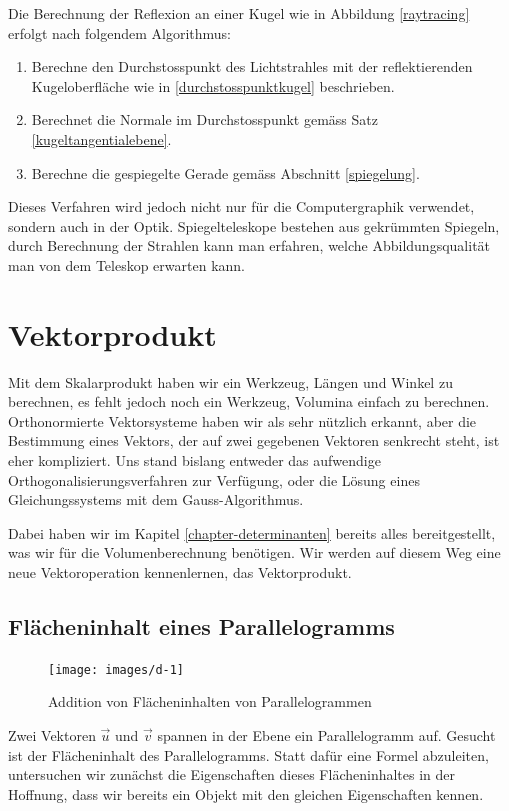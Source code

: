 Die Berechnung der Reflexion an einer Kugel wie in Abbildung \ref{raytracing}
erfolgt nach folgendem Algorithmus:
\begin{enumerate}
\item Berechne den Durchstosspunkt des Lichtstrahles mit der reflektierenden
Kugeloberfläche wie in \ref{durchstosspunktkugel} beschrieben.
\item Berechnet die Normale im Durchstosspunkt gemäss Satz \ref{kugeltangentialebene}.
\item Berechne die gespiegelte Gerade gemäss Abschnitt \ref{spiegelung}.
\end{enumerate}
Dieses Verfahren wird jedoch nicht nur für die Computergraphik verwendet,
sondern auch in der Optik.
Spiegelteleskope bestehen aus gekrümmten Spiegeln,
durch Berechnung der Strahlen kann man erfahren, welche Abbildungsqualität
man von dem Teleskop erwarten kann.

\section{Vektorprodukt}
Mit dem Skalarprodukt haben wir ein Werkzeug, Längen und Winkel zu berechnen,
es fehlt jedoch noch ein Werkzeug, Volumina einfach zu berechnen.
Orthonormierte
Vektorsysteme haben wir als sehr nützlich erkannt, aber die Bestimmung eines
Vektors, der auf zwei gegebenen Vektoren senkrecht steht, ist eher kompliziert.
Uns stand bislang entweder das
aufwendige Orthogonalisierungsverfahren zur Verfügung, oder die Lösung
eines Gleichungssystems mit dem Gauss-Algorithmus.

Dabei haben wir im Kapitel \ref{chapter-determinanten} bereits alles
bereitgestellt, was wir für die Volumenberechnung benötigen.
Wir werden auf diesem Weg eine neue Vektoroperation kennenlernen,
das Vektorprodukt.

\subsection{Flächeninhalt eines Parallelogramms}
\begin{figure}
\begin{center}
\texttt{[image: images/d-1]}
\end{center}
\caption{Addition von Flächeninhalten von Parallelogrammen
\label{image-flaeche-addition}}
\end{figure}
Zwei Vektoren $\vec u$ und $\vec v$ spannen in der Ebene ein Parallelogramm
auf.
Gesucht ist der Flächeninhalt des Parallelogramms.
Statt dafür eine
Formel abzuleiten, untersuchen wir zunächst die Eigenschaften dieses
Flächeninhaltes in der Hoffnung, dass wir bereits ein Objekt mit den
gleichen Eigenschaften kennen.

